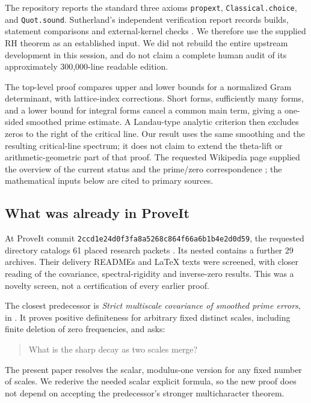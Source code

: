 \documentclass[11pt]{article}
\theoremstyle{definition}\newtheorem{definition}[theorem]{Definition}
\theoremstyle{remark}\newtheorem{remark}[theorem]{Remark}
\begin{document}
The repository reports the standard three axioms
\texttt{propext}, \texttt{Classical.choice}, and \texttt{Quot.sound}.
Sutherland's independent verification report records builds, statement
comparisons and external-kernel checks \cite{sutherland}. We therefore
use the supplied RH theorem as an established input. We did not rebuild
the entire upstream development in this session, and do not claim a
complete human audit of its approximately 300,000-line readable edition.

The top-level proof compares upper and lower bounds for a normalized Gram
determinant, with lattice-index corrections. Short forms, sufficiently
many forms, and a lower bound for integral forms cancel a common main
term, giving a one-sided smoothed prime estimate. A Landau-type analytic
criterion then excludes zeros to the right of the critical line. Our
result uses the same smoothing and the resulting critical-line spectrum;
it does not claim to extend the theta-lift or arithmetic-geometric part
of that proof. The requested Wikipedia page supplied the overview of
the current status and the prime/zero correspondence \cite{wiki}; the
mathematical inputs below are cited to primary sources.

\subsection{What was already in ProveIt}
At ProveIt commit \texttt{2ccd1e24d0f3fa8a5268c864f66a6b1b4e2d0d59},
the requested directory catalogs 61 placed research packets \cite{catalogue}.
Its nested  contains a further 29 archives.
Their delivery READMEs and LaTeX texts were screened, with closer reading
of the covariance, spectral-rigidity and inverse-zero results. This was a
novelty screen, not a certification of every earlier proof.

The closest predecessor is \emph{Strict multiscale covariance of smoothed
prime errors}, in  \cite{prior}.
It proves positive definiteness for arbitrary fixed distinct scales,
including finite deletion of zero frequencies, and asks:
\begin{quote}
What is the sharp decay as two scales merge?
\end{quote}
The present paper resolves the scalar, modulus-one version for any fixed
number of scales. We rederive the needed scalar explicit formula, so
the new proof does not depend on accepting the predecessor's stronger
multicharacter theorem.
\end{document}
